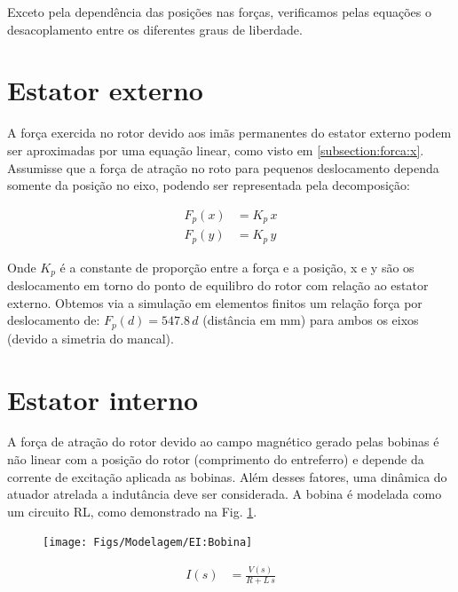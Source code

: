  Exceto pela dependência das posições nas forças, verificamos pelas equações o desacoplamento entre os diferentes graus de liberdade. 
 
 
%


\section{Estator externo}

A força exercida no rotor devido aos imãs permanentes do estator externo podem ser aproximadas por uma equação linear, como visto em \ref{subsection:forca:x}. Assumisse que a força de atração no roto para pequenos deslocamento dependa somente da posição no eixo, podendo ser representada pela decomposição:

\begin{align}
	F_p(x) &= K_p \, x \\
	F_p(y) &= K_p \, y 
\end{align}

Onde $K_p$ é a constante de proporção entre a força e a posição, x e y são os deslocamento em torno do ponto de equilibro do rotor com relação ao estator externo. Obtemos via a simulação em elementos finitos um relação força por deslocamento de: $ F_p(d) = 547.8 \,d $ (distância em mm) para ambos os eixos (devido a simetria do mancal).

\section{Estator interno}

A força de atração do rotor devido ao campo magnético gerado pelas bobinas é não linear com a posição do rotor (comprimento do entreferro) e depende da corrente de excitação aplicada as bobinas. Além desses fatores, uma dinâmica do atuador atrelada a indutância deve ser considerada. A bobina é modelada como um circuito RL, como demonstrado na Fig. \ref{fig:dinamico:EI:Bobina}.

\begin{figure}[th!]
\centering
\texttt{[image: Figs/Modelagem/EI:Bobina]}
\caption{}
\label{fig:dinamico:EI:Bobina}
\end{figure}

\begin{align}
	I(s) &= \frac{V(s)}{R + L \, s} 
\end{align}

